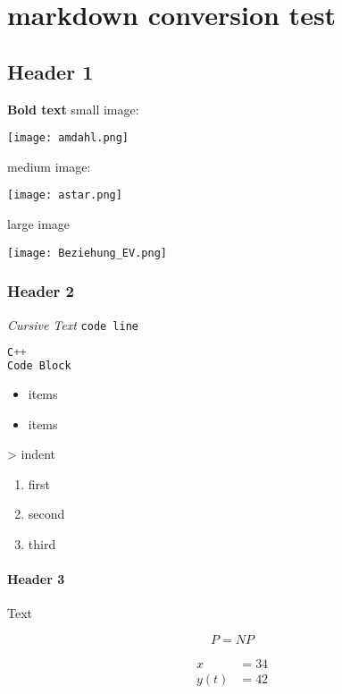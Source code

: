 \section{markdown conversion test}

\subsection{Header 1}
\textbf{Bold text}
small image:

\begin{center}
	\texttt{[image: amdahl.png]}
\end{center}
medium image:

\begin{center}
	\texttt{[image: astar.png]}
\end{center}
large image

\begin{center}
	\texttt{[image: Beziehung\_EV.png]}
\end{center}

\subsubsection{Header 2}
\textit{Cursive Text}
\texttt{code line}

\lstset{style=bright}\begin{lstlisting}[basicstyle=\footnotesize, language=C++]
C++
Code Block
\end{lstlisting}

\begin{itemize}[leftmargin=8pt, label = ·]
	\item items
	\item items
\end{itemize}

> indent


\begin{enumerate}[leftmargin=12pt]
	\item first
	\item second
	\item third
\end{enumerate}


\paragraph{Header 3}
Text


\begin{equation*}
P=NP
\end{equation*}

\begin{align*}
 x&= 34\\
 y(t) &= 42
\end{align*}


